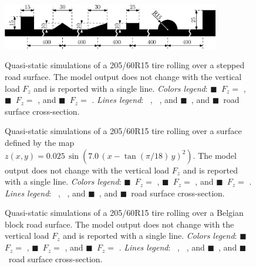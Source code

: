 \begin{figure}[htp]
  \centering
  \hfill\includegraphics[width=9.5cm]{./figures/chapter_3/steps_ipe}\\[0.1in]
  \caption{Quasi-static simulations of a 205/60R15 tire rolling over a stepped road surface. The \TMEasy{} model output does not change with the vertical load $F_z$ and is reported with a single line. \emph{Colors legend}: {\color{mycolor1}$\blacksquare$}~$F_z =$ , {\color{mycolor2}$\blacksquare$}~$F_z =$ , and {\color{mycolor3}$\blacksquare$}~$F_z =$ . \emph{Lines legend}: \raisebox{1.0pt}{\textbf{---}}~\Enve{}, \raisebox{1.0pt}{\textbf{-- --}}~\Swift{}, and {\color{mycolor5}$\blacksquare$}~\TMEasy{}, and {\color{black}$\blacksquare$}~road surface cross-section.}
  \label{chap3:fig:steps}
\end{figure}

\begin{figure}[htp]
  \centering
  \caption{Quasi-static simulations of a 205/60R15 tire rolling over a surface defined by the map $z(x,y) =  0.025\,\sin(7.0\,(x-\tan(\pi/18)\,y)^2)$. The \TMEasy{} model output does not change with the vertical load $F_z$ and is reported with a single line. \emph{Colors legend}: {\color{mycolor1}$\blacksquare$}~$F_z =$ , {\color{mycolor2}$\blacksquare$}~$F_z =$ , and {\color{mycolor3}$\blacksquare$}~$F_z =$ . \emph{Lines legend}: \raisebox{1.0pt}{\textbf{---}}~\Enve{}, \raisebox{1.0pt}{\textbf{-- --}}~\Swift{}, and {\color{mycolor5}$\blacksquare$}~\TMEasy{}, and {\color{black}$\blacksquare$}~road surface cross-section.}
  \label{chap3:fig:sine}
\end{figure}

\begin{figure}[htp]
  \centering
  \caption{Quasi-static simulations of a 205/60R15 tire rolling over a Belgian block road surface. The \TMEasy{} model output does not change with the vertical load $F_z$ and is reported with a single line. \emph{Colors legend}: {\color{mycolor1}$\blacksquare$}~$F_z =$ , {\color{mycolor2}$\blacksquare$}~$F_z =$ , and {\color{mycolor3}$\blacksquare$}~$F_z =$ . \emph{Lines legend}: \raisebox{1.0pt}{\textbf{---}}~\Enve{}, \raisebox{1.0pt}{\textbf{-- --}}~\Swift{}, and {\color{mycolor5}$\blacksquare$}~\TMEasy{}, and {\color{black}$\blacksquare$}~road surface cross-section.}
  \label{chap3:fig:cobblestone}
\end{figure}

